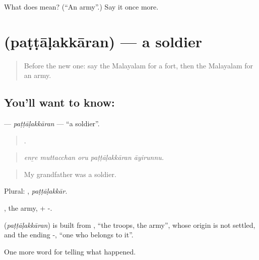 \begin{tcolorbox}[breakable,colback=teal!4,colframe=teal!35!black,title={Before you move on}]
What does  mean? (\textquotedblleft{}An army\textquotedblright{}.) Say it once more.
\end{tcolorbox}
\section[\texorpdfstring{\ml{പട്ടാളക്കാരൻ} (paṭṭāḷakkāran)}{പട്ടാളക്കാരൻ (paṭṭāḷakkāran)}]{ (paṭṭāḷakkāran) — a soldier}

\label{lesson:ML-C399-pattalakkaran}



\begin{quote}
Before the new one: say the Malayalam for a fort, then the Malayalam for an army.
\end{quote}

\subsection*{You'll want to know: }
\textbf{} — \emph{paṭṭāḷakkāran} — \textquotedblleft{}a soldier\textquotedblright{}.

\begin{quote}
    .
\end{quote}

\begin{quote}
\emph{enṟe muttacchan oru paṭṭāḷakkāran āyirunnu.}
\end{quote}

\begin{quote}
My grandfather was a soldier.
\end{quote}

Plural: , \emph{paṭṭāḷakkār}.

, the army, + -.

\begin{cousinweb}
\textbf{} (\emph{paṭṭāḷakkāran}) is built from , \textquotedblleft{}the troops, the army\textquotedblright{}, whose origin is not settled, and the ending -, \textquotedblleft{}one who belongs to it\textquotedblright{}.
\end{cousinweb}

\begin{grammarlens}[title={What you've built}]
One more word for telling what happened.
\end{grammarlens}

